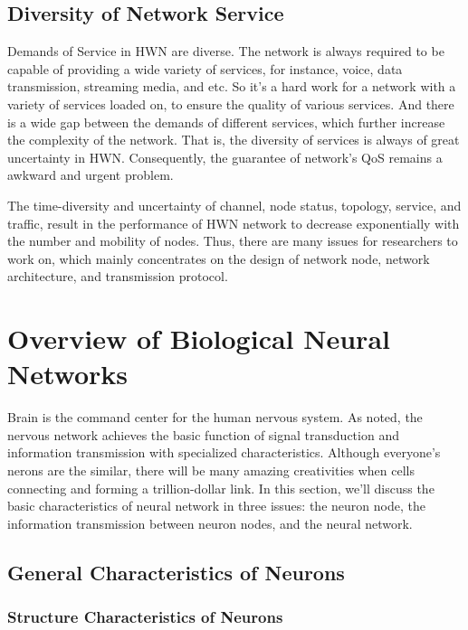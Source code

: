 \documentclass[journal,comsoc]{IEEEtran}
\begin{document}
		\subsection{Diversity of Network Service}
			Demands of Service in HWN are diverse. 
			The network is always required to be capable of providing a wide variety of services, for instance, voice, data transmission, streaming media, and etc.
			So it's a hard work for a network with a variety of services loaded on, to ensure the quality of various services.
			And there is a wide gap between the demands of different services, which further increase the complexity of the network.
			That is, the diversity of services is always of great uncertainty in HWN.
			Consequently, the guarantee of network's QoS remains a awkward and urgent problem.
			
			The time-diversity and uncertainty of channel, node status, topology, service, and traffic, 
			result in the performance of HWN network to decrease exponentially with the number and mobility of nodes.
			Thus, there are many issues for researchers to work on, 
			which mainly concentrates on the design of network node, network architecture, and transmission protocol.
	
	\section{Overview of Biological Neural Networks}
	\label{section: information_transmit}
		Brain is the command center for the human nervous system\cite{hart1983human}.
		As \cite{rsheng} noted, the nervous network achieves the basic function of signal transduction and information transmission with specialized characteristics.
		Although everyone's nerons are the similar, there will be many amazing creativities when cells connecting and forming a trillion-dollar link.
		In this section, we'll discuss the basic characteristics of neural network in three issues: 
		the neuron node, the  information transmission between neuron nodes, and the neural network.
		
		\subsection{General Characteristics of Neurons}
			\subsubsection{Structure Characteristics of Neurons}
			
\end{document}
